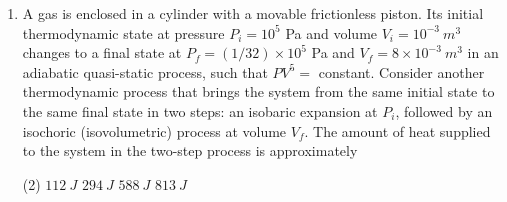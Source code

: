 \begin{enumerate}
    \item A gas is enclosed in a cylinder with a movable frictionless piston. Its initial thermodynamic state at pressure \(P_i = 10^5\) Pa and volume \(V_i = 10^{-3}\ m^3\) changes to a final state at \(P_f = (1/32) \times 10^5\) Pa and \(V_f = 8 \times 10^{-3}\ m^3\) in an adiabatic quasi-static process, such that \(P V^{5} =\) constant. Consider another thermodynamic process that brings the system from the same initial state to the same final state in two steps: an isobaric expansion at \(P_i\), followed by an isochoric (isovolumetric) process at volume \(V_f\). The amount of heat supplied to the system in the two-step process is approximately
        \begin{tasks}(2)
            \task \(112\ J\)
            \task \(294\ J\)
            \task \(588\ J\)
            \task \(813\ J\)
        \end{tasks}
\end{enumerate}
